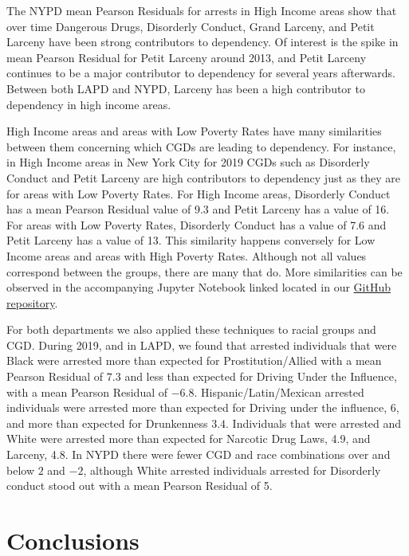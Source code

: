 \documentclass{article}
\begin{document}
\newpage
\restoregeometry
 The NYPD mean Pearson Residuals for arrests in High Income  areas show that over time Dangerous Drugs, Disorderly Conduct, Grand Larceny, and Petit Larceny have been strong contributors to dependency. Of interest is the spike in mean Pearson Residual for Petit Larceny around 2013, and Petit Larceny continues to be a major contributor to dependency for several years afterwards. Between both LAPD and NYPD, Larceny has been a high contributor to dependency in high income areas.

High Income areas and areas with Low Poverty Rates have many similarities between them concerning which CGDs are leading to dependency. For instance, in  High Income areas in New York City for 2019 CGDs such as Disorderly Conduct and Petit Larceny are high contributors to dependency just as they are for areas with Low Poverty Rates. For High Income areas, Disorderly Conduct has a mean Pearson Residual value of 9.3 and Petit Larceny has a value of 16. For areas with Low Poverty Rates, Disorderly Conduct has a value of 7.6 and Petit Larceny has a value of 13. This similarity happens conversely for Low Income areas and areas with High Poverty Rates. Although not all values correspond between the groups, there are many that do. More similarities can be observed in the accompanying Jupyter Notebook linked located in our \href{https://github.com/MilesMena/Policing-Report}{GitHub repository}. 


For both departments we also applied these techniques to racial groups and CGD. During 2019, and in LAPD, we found that arrested individuals that were Black were arrested more than expected for Prostitution/Allied with a mean Pearson Residual of  $7.3$ and less than expected for Driving Under the Influence, with a mean Pearson Residual of $-6.8$. Hispanic/Latin/Mexican arrested individuals were arrested more than expected for Driving under the influence, 6, and more than expected for Drunkenness $3.4$. Individuals that were arrested and White were arrested more than expected for Narcotic Drug Laws, 4.9, and Larceny, 4.8. In NYPD there were fewer CGD and race combinations over and below $2$ and $-2$, although White arrested individuals arrested for Disorderly conduct stood out with a mean Pearson Residual of 5.\cite{github}








\section{Conclusions}
\end{document}
